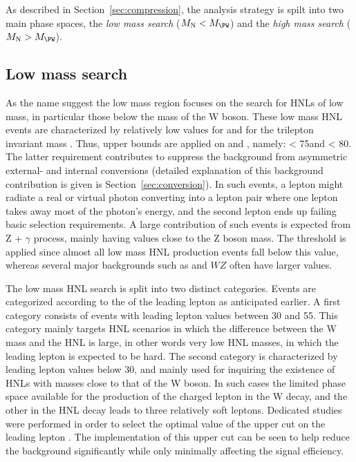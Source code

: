 As described in Section~\ref{sec:compression}, the analysis
strategy is spilt into two main phase spaces, the \emph{low mass search} ($M_\hnl <
M_\PW$) and the \emph{high mass search} ($M_\hnl > M_\PW$).

\subsection{Low mass search}

As the name suggest the low mass region focuses on
the search for HNLs of low mass, in particular those below the mass
of the W boson. These low mass HNL events are characterized by
relatively low values for \ptmiss  and for the trilepton invariant mass
\mlll. Thus, upper bounds are applied on \ptmiss  and \mlll , namely:
\ptmiss < 75\GeV and \mlll < 80\GeV. The latter requirement contributes to 
suppress the background from asymmetric external- and
internal conversions (detailed explanation of this background
contribution is given is Section~\ref{sec:conversion}). In such events, a lepton might radiate a real or
virtual photon converting into a lepton pair where one lepton takes
away most of the photon's energy, and the second lepton ends up
failing basic selection requirements. A large contribution of such
events is expected from Z + $\gamma$ process, mainly having \mlll
values close to the Z boson mass.
The \ptmiss threshold is applied since almost all low mass HNL production
events fall below this value, whereas several major backgrounds such
as \ttbar and $WZ$ often have larger \ptmiss  values.

The low mass HNL search is split into two distinct categories. Events
are categorized according to the \pt of the leading lepton as
anticipated earlier. A first category consists of events with leading
lepton \pt values between 30 and 55\GeV. This category mainly targets
HNL scenarios in which the difference between the W mass and the HNL
is large, in other words very low HNL masses, in which the leading
lepton is expected to be hard. The second category is characterized by
leading lepton \pt values below 30\GeV, and mainly used for inquiring
the existence of HNLs with masses close to that of the W boson. In
such cases the limited phase space available for the production of the
charged lepton in the W decay, and the other in the HNL decay leads to
three relatively soft leptons.
Dedicated studies were performed in order to select the optimal value
of the upper \pt cut on the leading lepton \pt.
The implementation of this upper \pt cut can be seen to help reduce the background significantly while only minimally affecting the signal efficiency.

